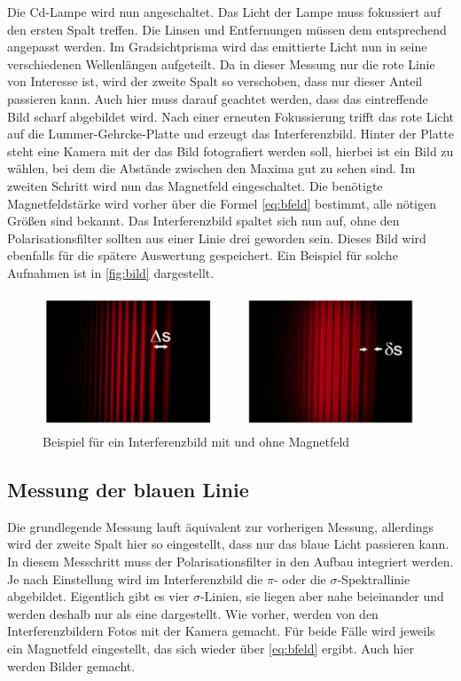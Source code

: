 Die Cd-Lampe wird nun angeschaltet.
Das Licht der Lampe muss fokussiert auf den ersten Spalt treffen. 
Die Linsen und Entfernungen müssen dem entsprechend angepasst werden.
Im Gradsichtprisma wird das emittierte Licht nun in seine verschiedenen Wellenlängen aufgeteilt.
Da in dieser Messung nur die rote Linie von Interesse ist, wird der zweite Spalt so verschoben, dass nur dieser Anteil passieren kann. 
Auch hier muss darauf geachtet werden, dass das eintreffende Bild scharf abgebildet wird. 
Nach einer erneuten Fokussierung trifft das rote Licht auf die Lummer-Gehrcke-Platte und erzeugt das Interferenzbild.
Hinter der Platte steht eine Kamera mit der das Bild fotografiert werden soll, hierbei ist ein Bild zu wählen, bei dem die Abstände zwischen den Maxima gut zu sehen sind.
Im zweiten Schritt wird nun das Magnetfeld eingeschaltet. 
Die benötigte Magnetfeldstärke wird vorher über die Formel \autoref{eq:bfeld} bestimmt, alle nötigen Größen sind bekannt. 
Das Interferenzbild spaltet sich nun auf, ohne den Polarisationsfilter sollten aus einer Linie drei geworden sein.
Dieses Bild wird ebenfalls für die spätere Auswertung gespeichert.
Ein Beispiel für solche Aufnahmen ist in \autoref{fig:bild} dargestellt.
\begin{figure}
    \centering
    \includegraphics[width=\textwidth]{images/bild.png}
    \caption{Beispiel für ein Interferenzbild mit und ohne Magnetfeld \cite{V27}}
    \label{fig:bild}
\end{figure}

\subsection{Messung der blauen Linie}
\label{ssec:durch3}

Die grundlegende Messung lauft äquivalent zur vorherigen Messung, allerdings wird der zweite Spalt hier so eingestellt, dass nur das blaue Licht passieren kann.
In diesem Messchritt muss der Polarisationsfilter in den Aufbau integriert werden. 
Je nach Einstellung wird im Interferenzbild die $\pi$- oder die $\sigma$-Spektrallinie abgebildet. 
Eigentlich gibt es vier $\sigma$-Linien, sie liegen aber nahe beieinander und werden deshalb nur als eine dargestellt. 
Wie vorher, werden von den Interferenzbildern Fotos mit der Kamera gemacht.
Für beide Fälle wird jeweils ein Magnetfeld eingestellt, das sich wieder über \autoref{eq:bfeld} ergibt.
Auch hier werden Bilder gemacht.
